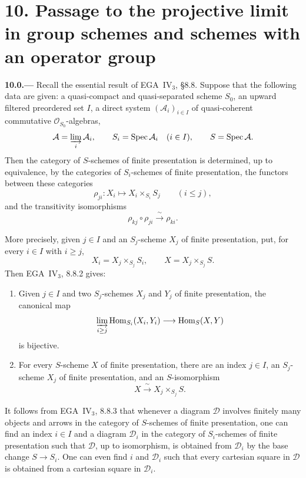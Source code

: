 
\section*{10. Passage to the projective limit in group schemes
  and schemes with an operator group}
\label{sec:sga3-VIB-10}%

\medskip
{}\label{par:sga3-VIB-10.0}%
\noindent\textbf{10.0.---}
Recall the essential result of EGA~IV\(_3\), \S 8.8.
Suppose that the following data are given: a quasi-compact and
quasi-separated scheme \(S_0\), an upward filtered preordered set
\(I\), a direct system
\((\mathcal A_i)_{i\in I}\) of quasi-coherent commutative
\(\mathcal O_{S_0}\)-algebras,
\[
  \mathcal A=\varinjlim_i\mathcal A_i,\qquad
  S_i=\operatorname{Spec}\mathcal A_i\quad(i\in I),
  \qquad
  S=\operatorname{Spec}\mathcal A.
\]
Then the category of \(S\)-schemes of finite presentation is
determined, up to equivalence, by the categories of
\(S_i\)-schemes of finite presentation, the functors between
these categories
\[
  \rho_{ji}:X_i\longmapsto X_i\times_{S_i}S_j
  \qquad(i\leq j),
\]
and the transitivity isomorphisms
\[
  \rho_{kj}\circ\rho_{ji}\xrightarrow{\ \sim\ }\rho_{ki}.
\]

More precisely, given \(j\in I\) and an \(S_j\)-scheme
\(X_j\) of finite presentation, put, for every \(i\in I\)
with \(i\geq j\),
\[
  X_i=X_j\times_{S_j}S_i,
  \qquad
  X=X_j\times_{S_j}S.
\]
Then EGA~IV\(_3\), 8.8.2 gives:
\begin{enumerate}
\item[\textup{(i)}]\label{concl:sga3-VIB-10.0-i}
  Given \(j\in I\) and two \(S_j\)-schemes \(X_j\) and \(Y_j\)
  of finite presentation, the canonical map
  \label{form:sga3-VIB-10.0-Hom-limit}%
  \[
    \varinjlim_{i\geq j}
      \operatorname{Hom}_{S_i}(X_i,Y_i)
      \longrightarrow
      \operatorname{Hom}_S(X,Y)
  \]
  is bijective.

\item[\textup{(ii)}]\label{concl:sga3-VIB-10.0-ii}
  For every \(S\)-scheme \(X\) of finite presentation, there
  are an index \(j\in I\), an \(S_j\)-scheme \(X_j\) of finite
  presentation, and an \(S\)-isomorphism
  \[
    X\xrightarrow{\ \sim\ }X_j\times_{S_j}S.
  \]
\end{enumerate}

It follows from EGA~IV\(_3\), 8.8.3 that whenever a diagram
\(\mathcal D\) involves finitely many objects and arrows in
the category of \(S\)-schemes of finite presentation, one can
find an index \(i\in I\) and a diagram \(\mathcal D_i\) in the
category of \(S_i\)-schemes of finite presentation such that
\(\mathcal D\), up to isomorphism, is obtained from
\(\mathcal D_i\) by the base change \(S\to S_i\). One can even
find \(i\) and \(\mathcal D_i\) such that every cartesian square
in \(\mathcal D\) is obtained from a cartesian square in
\(\mathcal D_i\).

